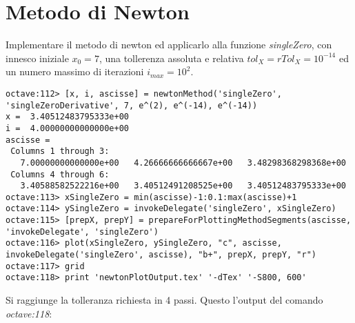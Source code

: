 \section{Metodo di Newton}
\label{sec:metodoDiNewton}

\begin{exercise}
Implementare il metodo di newton ed applicarlo alla funzione \emph{singleZero},
con innesco iniziale $x_{0} = 7$, una tollerenza assoluta e relativa
$tol_{X} = rTol_{X} = 10^{-14}$ ed un numero massimo di iterazioni
$i_{max} = 10^{2}$.
\end{exercise}
\begin{lstlisting}
octave:112> [x, i, ascisse] = newtonMethod('singleZero', 'singleZeroDerivative', 7, e^(2), e^(-14), e^(-14))
x =  3.40512483795333e+00
i =  4.00000000000000e+00
ascisse =
 Columns 1 through 3:
   7.00000000000000e+00   4.26666666666667e+00   3.48298368298368e+00
 Columns 4 through 6:
   3.40588582522216e+00   3.40512491208525e+00   3.40512483795333e+00
octave:113> xSingleZero = min(ascisse)-1:0.1:max(ascisse)+1
octave:114> ySingleZero = invokeDelegate('singleZero', xSingleZero)
octave:115> [prepX, prepY] = prepareForPlottingMethodSegments(ascisse, 'invokeDelegate', 'singleZero')
octave:116> plot(xSingleZero, ySingleZero, "c", ascisse, invokeDelegate('singleZero', ascisse), "b+", prepX, prepY, "r")
octave:117> grid
octave:118> print 'newtonPlotOutput.tex' '-dTex' '-S800, 600'
\end{lstlisting}
Si raggiunge la tolleranza richiesta in 4 passi. Questo l'output del comando
\emph{octave:118}:
\begin{center}

\end{center}